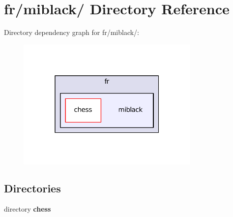 \section{fr/miblack/ Directory Reference}
\label{dir_5ba8d999f2e019156f4dc7665a5c01b7}
Directory dependency graph for fr/miblack/\-:
\nopagebreak
\begin{figure}[H]
\begin{center}
\leavevmode
\includegraphics[width=254pt]{dir_5ba8d999f2e019156f4dc7665a5c01b7_dep}
\end{center}
\end{figure}
\subsection*{Directories}
\begin{DoxyCompactItemize}
\item 
directory {\bf chess}
\end{DoxyCompactItemize}
